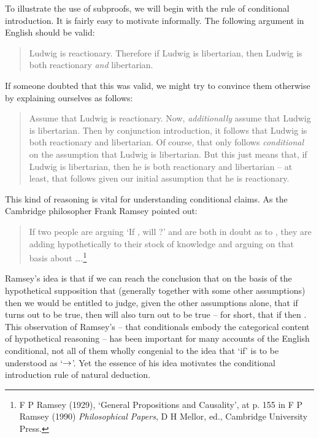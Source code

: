 To illustrate the use of subproofs, we will begin with the rule of conditional introduction. It is fairly easy to motivate informally.\label{ci.motivate} The following argument in English should be valid:
	\begin{quote}
		Ludwig is reactionary. Therefore if Ludwig is libertarian, then Ludwig is both reactionary \emph{and} libertarian.
	\end{quote}
If someone doubted that this was valid, we might try to convince them otherwise by explaining ourselves as follows:
	\begin{quote}
		Assume that Ludwig is reactionary. Now, \emph{additionally} assume that Ludwig is libertarian. Then by conjunction introduction, it follows that Ludwig is both reactionary and libertarian. Of course, that only follows \emph{conditional} on the assumption that Ludwig is libertarian. But this just means that, if Ludwig is libertarian, then he is both reactionary and libertarian – at least, that follows given our initial assumption that he is reactionary.
	\end{quote}

This kind of reasoning is vital for understanding conditional claims. As the Cambridge philosopher Frank Ramsey pointed out: \begin{quote}
	If two people are arguing ‘If , will ?’ and are both in doubt as to , they are adding  hypothetically to their stock of knowledge and arguing on that basis about ….\footnote{F P Ramsey (1929), ‘General Propositions and Causality’, at p. 155 in F P Ramsey (1990) \emph{Philosophical Papers}, D H Mellor, ed., Cambridge University Press.}
\end{quote}
Ramsey’s idea is that if we can reach the conclusion that  on the basis of the hypothetical supposition that  (generally together with some other assumptions) then we would be entitled to judge, given the other assumptions alone, that if  turns out to be true, then  will also turn out to be true – for short, that if  then . This observation of Ramsey's – that conditionals embody the categorical content of hypothetical reasoning – has been important for many accounts of the English conditional, not all of them wholly congenial to the idea that `if' is to be understood as `$\rightarrow$'. Yet the essence of his idea motivates the conditional introduction rule of natural deduction.

